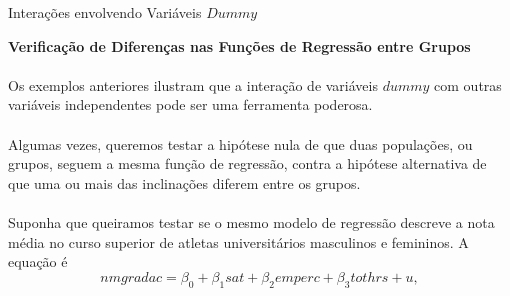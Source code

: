\documentclass[t,14pt,mathserif]{beamer}
\begin{document}
{
\begin{frame}{Interações envolvendo Variáveis $Dummy$}
		\begin{tcolorbox}
			\indent\textbf{\small{Verificação de Diferenças nas Funções de Regressão entre Grupos}}\\ 
			\\ \footnotesize{Os exemplos anteriores ilustram que a interação de variáveis $dummy$ com outras variáveis independentes pode ser uma ferramenta poderosa.}\\
			\\ \footnotesize{Algumas vezes, queremos testar a hipótese nula de que duas populações, ou grupos, seguem a mesma função de regressão, contra a hipótese alternativa de que uma ou mais das inclinações diferem entre os grupos.}\\
		    \\ \footnotesize{Suponha que queiramos testar se o mesmo modelo de regressão descreve a nota média no curso superior de atletas universitários masculinos e femininos. A equação é} 
		    	\begin{equation}
			nmgradac = \beta_{0} + \beta_{1}sat + \beta_{2}emperc + \beta_{3}tothrs + u,\label{eq1}\nonumber
			\end{equation}
		\end{tcolorbox}
       
\end{frame}
}  
\end{document}
